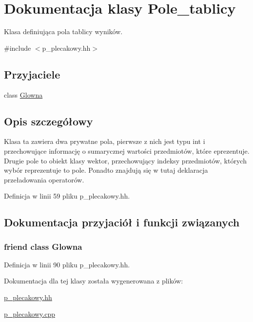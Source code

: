 \hypertarget{class_pole__tablicy}{\section{\-Dokumentacja klasy \-Pole\-\_\-tablicy}
\label{class_pole__tablicy}
}


\-Klasa definiująca pola tablicy wyników.  




{\ttfamily \#include $<$p\-\_\-plecakowy.\-hh$>$}

\subsection*{\-Przyjaciele}
\begin{DoxyCompactItemize}
\item 
class \hyperlink{class_pole__tablicy_af5e32df0a3534c50807b1860fd973d52}{\-Glowna}
\end{DoxyCompactItemize}


\subsection{\-Opis szczegółowy}
\-Klasa ta zawiera dwa prywatne pola, pierwsze z nich jest typu int i przechowujące informację o sumarycznej wartości przedmiotów, które eprezentuje. \-Drugie pole to obiekt klasy wektor, przechowujący indeksy przedmiotów, których wybór reprezentuje to pole. \-Ponadto znajdują się w tutaj deklaracja przeładowania operatorów. 

\-Definicja w linii 59 pliku p\-\_\-plecakowy.\-hh.



\subsection{\-Dokumentacja przyjaciół i funkcji związanych}
\hypertarget{class_pole__tablicy_af5e32df0a3534c50807b1860fd973d52}{
\subsubsection[{\-Glowna}]{\setlength{\rightskip}{0pt plus 5cm}friend class {\bf \-Glowna}}}\label{class_pole__tablicy_af5e32df0a3534c50807b1860fd973d52}


\-Definicja w linii 90 pliku p\-\_\-plecakowy.\-hh.



\-Dokumentacja dla tej klasy została wygenerowana z plików\-:\begin{DoxyCompactItemize}
\item 
\hyperlink{p__plecakowy_8hh}{p\-\_\-plecakowy.\-hh}\item 
\hyperlink{p__plecakowy_8cpp}{p\-\_\-plecakowy.\-cpp}\end{DoxyCompactItemize}
